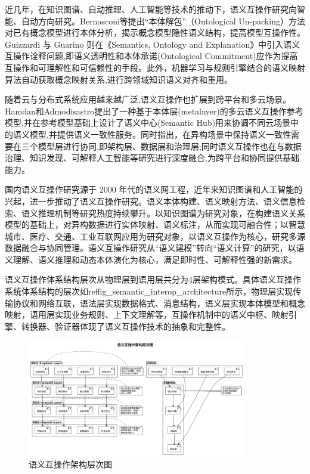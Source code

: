 近几年，在知识图谱、自动推理、人工智能等技术的推动下，语义互操作研究向智能、自动方向研究。Bernasconi等提出“本体解包”（Ontological Un-packing）方法对已有概念模型进行本体分析，揭示概念模型隐性语义结构，提高模型互操作性\cite{Guizzardi2023Explanation}。Guizzardi 与 Guarino 则在《Semantics, Ontology and Explanation》中引入语义互操作诠释问题,即语义透明性和本体承诺(Ontological Commitment)应作为提高互操作和可理解性和可信赖性的手段\cite{Guizzardi2023Explanation}。此外，机器学习与规则引擎结合的语义映射算法自动获取概念映射关系,进行跨领域知识语义对齐和重用。

随着云与分布式系统应用越来越广泛,语义互操作也扩展到跨平台和多云场景。Hamdan和Admodisastro提出了一种基于本体层(metalayer)的多云语义互操作参考模型,并在参考模型基础上设计了语义中心(Semantic Hub)用来协调不同云场景中的语义模型,并提供语义一致性服务\cite{Hamdan2023Reference,SemanticMultiCloud2024}。同时指出，在异构场景中保持语义一致性需要在三个模型层进行协同,即架构层、数据层和治理层;同时语义互操作也在与数据治理、知识发现、可解释人工智能等研究进行深度融合,为跨平台和协同提供基础能力。

国内语义互操作研究源于 2000 年代的语义网工程，近年来知识图谱和人工智能的兴起，进一步推动了语义互操作研究。语义本体构建、语义映射方法、语义信息检索、语义推理机制等研究热度持续攀升。以知识图谱为研究对象，在构建语义关系模型的基础上，对异构数据进行实体映射、语义标注，从而实现可融合性；以智慧城市、医疗、交通、工业互联网应用为研究对象，以语义互操作为核心，研究多源数据融合与协同管理。语义互操作研究从“语义建模”转向“语义计算”的研究，以语义理解、语义推理和动态本体演化为核心，满足即时性、可解释性强的新需求。

语义互操作体系结构层次从物理层到语用层共分为4层架构模式。具体语义互操作系统体系结构的层次如ref{fig_semantic_interop_architecture}所示，物理层实现传输协议和网络互联，语法层实现数据格式、消息结构，语义层实现本体模型和概念映射，语用层实现业务规则、上下文理解等，互操作机制中的语义中枢、映射引擎、转换器、验证器体现了语义互操作技术的抽象和完整性。

\begin{figure}[H]
    \centering
    \includegraphics[width=0.85\textwidth,height=0.7\textheight,keepaspectratio]{chapters/fig-0/semantic_interop_architecture.png}
    \caption{语义互操作架构层次图}
    \label{fig_semantic_interop_architecture}
\end{figure}


